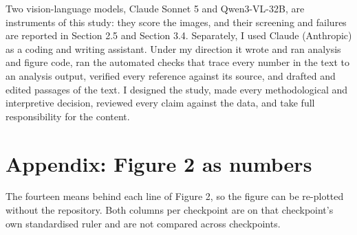 \documentclass[11pt]{article}
\begin{document}
Two vision-language models, Claude Sonnet 5 and Qwen3-VL-32B, are instruments of
this study: they score the images, and their screening and failures are reported
in Section 2.5 and Section 3.4. Separately, I used Claude (Anthropic) as a
coding and writing assistant. Under my direction it wrote and ran analysis and
figure code, ran the automated checks that trace every number in the text to an
analysis output, verified every reference against its source, and drafted and
edited passages of the text. I designed the study, made every methodological and
interpretive decision, reviewed every claim against the data, and take full
responsibility for the content.

\section{Appendix: Figure 2 as numbers}\label{appendix-figure-2-as-numbers}

The fourteen means behind each line of Figure 2, so the figure can be re-plotted
without the repository. Both columns per checkpoint are on that checkpoint's own
standardised ruler and are not compared across checkpoints.
\end{document}
